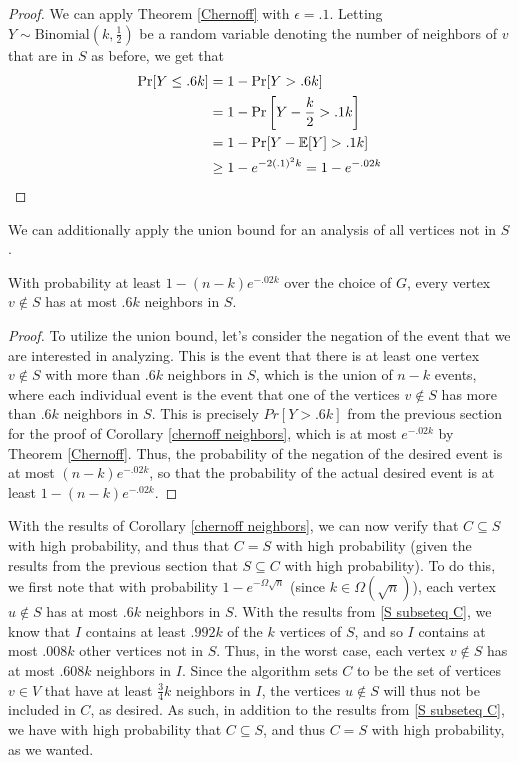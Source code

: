 \documentclass{article}
\begin{document}
\begin{proof}
    We can apply Theorem \ref{Chernoff} with $\epsilon = .1$. Letting $Y \sim
    \text{Binomial}\left(k, \frac{1}{2}\right)$ be a
    random variable
    denoting the number of neighbors of $v$ that are in $S$ as before, we get that
    \begin{align*}
        \Pr[Y \leq .6k] &= 1 - \Pr[Y > .6k]
        \\
        &= 1 - \Pr\left[Y - \frac{k}{2} > .1k\right]
        \\
        &= 1 - \Pr[Y - \operatorname{\mathbb{E}}[Y] > .1k]
        \\
        &\geq 1 - e^{-2(.1)^{2}k} = 1 - e^{-.02k}
    \end{align*}
\end{proof}

We can additionally apply the union bound for an analysis of all vertices not
in $S$.

\begin{corollary}
    With probability at least $1 - (n - k) e^{-.02k}$ over the choice of $G$,
    every vertex $v \notin S$ has at most $.6k$ neighbors in $S$.
\end{corollary}

\begin{proof}
    To utilize the union bound, let's consider the negation of the event that
    we are interested in analyzing. This is the event that there is at least
    one vertex $v \notin S$ with more than $.6k$ neighbors in $S$, which is the
    union of $n - k$ events, where each individual event is the event that one
    of the vertices $v \notin S$ has more than $.6k$ neighbors in $S$. This is
    precisely $Pr[Y > .6k]$ from the previous section for the proof of
    Corollary \ref{chernoff neighbors}, which is at most $e^{-.02k}$ by Theorem
    \ref{Chernoff}. Thus, the probability of the negation of the desired event is at
    most $(n - k) e^{-.02k}$, so that the probability of the actual desired
    event is at least $1 - (n - k) e^{-.02k}$.

\end{proof}

With the results of Corollary \ref{chernoff neighbors}, we can now verify that
$C \subseteq S$ with high probability, and thus that $C = S$ with high
probability (given the results from the previous section that $S \subseteq C$
with high probability). To do this, we first note that with probability $1 -
e^{-\Omega{\sqrt{n}}}$ (since $k \in \Omega(\sqrt{n})$), each
vertex $u \notin S$ has at most $.6k$ neighbors in $S$. With the results from
\ref{S subseteq C}, we know that $I$ contains at least $.992k$ of the $k$
vertices of $S$, and so $I$ contains at most $.008k$ other vertices not in $S$.
Thus, in the worst case, each vertex $v \notin S$ has at most $.608k$ neighbors
in $I$.
Since the algorithm
sets $C$ to be the set of vertices $v \in V$ that have at least $\frac{3}{4} k$
neighbors in $I$, the vertices $u \notin S$ will thus not be included in $C$,
as desired. As such, in addition to the results from \ref{S subseteq C}, we have
with high probability that $C \subseteq S$, and thus $C =
S$ with high probability, as we wanted.
\end{document}
